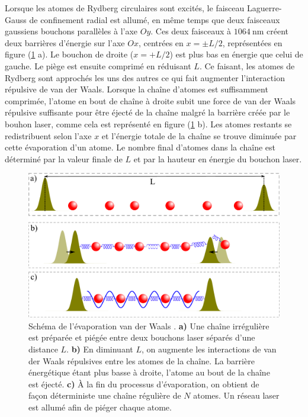 Lorsque les atomes de Rydberg circulaires sont excités, le faisceau Laguerre-Gauss de confinement radial est allumé, en même temps que deux faisceaux gaussiens \og bouchons \fg{} parallèles à l'axe $Oy$.
Ces deux faisceaux à $\SI{1064}{\nano\meter}$ créent deux barrières d'énergie sur l'axe $Ox$, centrées en $x=\pm L/2$, représentées en figure (\ref{fig:plugs_evap} a).
Le bouchon de droite ($x=+L/2$) est plus bas en énergie que celui de gauche.
Le piège est ensuite comprimé en réduisant $L$.
Ce faisant, les atomes de Rydberg sont approchés les uns des autres ce qui fait augmenter l'interaction répulsive de van der Waals.
Lorsque la chaîne d'atomes est suffisamment comprimée, l'atome en bout de chaîne à droite%
subit une force de van der Waals répulsive suffisante pour être éjecté de la chaîne malgré la barrière créée par le bouhon laser, comme cela est représenté en figure (\ref{fig:plugs_evap} b).
Les atomes restants se redistribuent selon l'axe $x$ et l'énergie totale de la chaîne se trouve diminuée par cette \og évaporation \fg{} d'un atome.
Le nombre final d'atomes dans la chaîne est déterminé par la valeur finale de $L$ et par la hauteur en énergie du bouchon laser.
%
\begin{figure}[h]
\centering
\includegraphics[width=0.8\linewidth]{figures/circsim/plugs_evap}
\caption[Schéma de l'\og évaporation van der Waals \fg{} ]{
Schéma de l'\og évaporation van der Waals \fg{}.
\textbf{a)} Une chaîne irrégulière est préparée et piégée entre deux \og bouchons \fg{} laser séparés d'une distance $L$.
\textbf{b)} En diminuant $L$, on augmente les interactions de van der Waals répulsives entre les atomes de la chaîne.
La barrière énergétique étant plus basse à droite, l'atome au bout de la chaîne est éjecté.
\textbf{c)} \`A la fin du processus d'évaporation, on obtient de façon déterministe une chaîne régulière de $N$ atomes. Un réseau laser est allumé afin de piéger chaque atome.
}
\label{fig:plugs_evap}
\end{figure}
%

